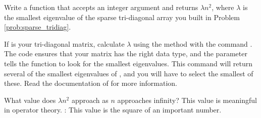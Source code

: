 \begin{problem}
Write a function that accepts an integer argument  and returns $\lambda n^2$, where
$\lambda$ is the smallest eigenvalue of the sparse tri-diagonal array you built in Problem \ref{prob:sparse_tridiag}.

If  is your tri-diagonal matrix, calculate $\lambda$ using the method  with the command . 
The code  ensures that your matrix has the right data type, and the parameter  tells the function to look for the smallest eigenvalues. 
This command will return several of the smallest eigenvalues of , and you will have to select the smallest of these. 
Read the documentation of  for more information.

What value does $\lambda n^2$ approach as $n$ approaches infinity? 
This value is meaningful in operator theory. 
: This value is the square of an important number.

\end{problem}





 
